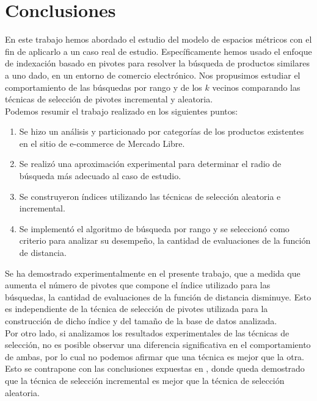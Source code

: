 \chapter{Conclusiones}

En este trabajo hemos abordado el estudio del modelo de espacios m\'etricos con el fin de aplicarlo a un caso real de estudio. Específicamente hemos usado el enfoque de indexaci\'on basado en pivotes para resolver la b\'usqueda de productos similares a uno dado, en un entorno de comercio electr\'onico. Nos propusimos estudiar el comportamiento de las b\'usquedas por rango y de los $k$ vecinos comparando las t\'ecnicas de selecci\'on de pivotes incremental y aleatoria.\\

Podemos resumir el trabajo realizado en los siguientes puntos:

\begin{enumerate}
\item Se hizo un an\'alisis y particionado por categor\'ias de los productos existentes en el sitio de e-commerce de Mercado Libre.
\item Se realiz\'o una aproximaci\'on experimental para determinar el radio de b\'usqueda m\'as adecuado al caso de estudio.
\item Se construyeron \'indices utilizando las t\'ecnicas de selecci\'on aleatoria e incremental.
\item Se implement\'o el algoritmo de b\'usqueda por rango y  se seleccion\'o como criterio para analizar su desempeño, la cantidad de evaluaciones de la funci\'on de distancia.
\end{enumerate}

Se ha demostrado experimentalmente en el presente trabajo, que a medida que aumenta el n\'umero de pivotes que compone el \'indice utilizado para las b\'usquedas, la cantidad de evaluaciones de la funci\'on de distancia disminuye. Esto es independiente de la t\'ecnica de selecci\'on de pivotes utilizada para la construcci\'on de dicho \'indice y del tamaño de la base de datos analizada.\\

Por otro lado, si analizamos los resultados experimentales de las t\'ecnicas de selecci\'on, no es posible observar una diferencia significativa en el comportamiento de ambas, por lo cual no podemos afirmar que una t\'ecnica es mejor que la otra. Esto se contrapone con las conclusiones expuestas en \cite{BNCsccc01}, donde queda demostrado que la t\'ecnica de selecci\'on incremental es mejor que la t\'ecnica de selecci\'on aleatoria.\\

